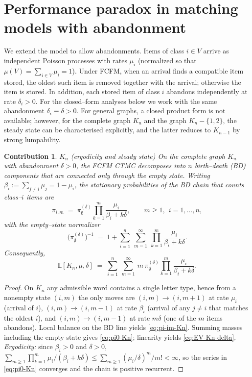 \documentclass[11pt]{article}
\newtheorem{contribution}{Contribution}
\begin{document}
\section{Performance paradox in matching models with abandonment}\label{sec:abandonment}
We extend the model to allow abandonments. Items of class $i\in V$ arrive as independent Poisson processes with rates $\mu_i$ (normalized so that $\mu(V)=\sum_{i\in V}\mu_i=1$). Under \textsc{FCFM}, when an arrival finds a compatible item stored, the oldest such item is removed together with the arrival; otherwise the item is stored. In addition, each stored item of class $i$ abandons independently at rate $\delta_i>0$. For the closed–form analyses below we work with the same abandonment $\delta_i\equiv\delta>0$.
For general graphs, a closed product form is not available; however, for the complete graph $K_n$ and the graph $K_n-\{1,2\}$, the steady state can be characterised explicitly, and the latter reduces to $K_{n-1}$ by strong lumpability.

\begin{contribution}{ $K_n$ (ergodicity and steady state)}
	On the complete graph $K_n$ with abandonment $\delta>0$, the \textsc{FCFM} CTMC decomposes into $n$ birth–death (BD) components that are connected only through the empty state. Writing $\beta_i:=\sum_{j\neq i}\mu_j=1-\mu_i$, the stationary probabilities of the BD chain that counts class–$i$ items are
	\begin{equation}\label{eq:pi-im-Kn}
		\pi_{i,m}\;=\;\pi_{\emptyset}^{(\delta)}\prod_{k=1}^{m}\frac{\mu_i}{\beta_i+k\delta},\qquad m\ge 1,\ \ i=1,\dots,n,
	\end{equation}
	with the empty–state normalizer
	\begin{equation}\label{eq:pi0-Kn}
		\bigl(\pi_{\emptyset}^{(\delta)}\bigr)^{-1}\;=\;1+\sum_{i=1}^{n}\ \sum_{m=1}^{\infty}\ \prod_{k=1}^{m}\frac{\mu_i}{\beta_i+k\delta}.
	\end{equation}
	Consequently,
	\begin{equation}\label{eq:EV-Kn-delta}
		\mathbb{E}[K_n,\mu,\delta]\;=\;\sum_{i=1}^{n}\ \sum_{m=1}^{\infty}\ m\,\pi_{\emptyset}^{(\delta)}\prod_{k=1}^{m}\frac{\mu_i}{\beta_i+k\delta}.
	\end{equation}
\end{contribution}

\begin{proof}[Proof]
	On $K_n$ any admissible word contains a single letter type, hence from a nonempty state $(i,m)$ the only moves are $(i,m)\to(i,m+1)$ at rate $\mu_i$ (arrival of $i$), $(i,m)\to(i,m-1)$ at rate $\beta_i$ (arrival of any $j\neq i$ that matches the oldest $i$), and $(i,m)\to(i,m-1)$ at rate $m\delta$ (one of the $m$ items abandons). Local balance on the BD line yields \eqref{eq:pi-im-Kn}. Summing masses including the empty state gives \eqref{eq:pi0-Kn}; linearity yields \eqref{eq:EV-Kn-delta}. 
	\emph{Ergodicity:} since $\beta_i>0$ and $\delta>0$, $\sum_{m\ge1}\prod_{k=1}^{m}\mu_i/(\beta_i+k\delta)\le \sum_{m\ge1}(\mu_i/\delta)^m/m!<\infty$, so the series in \eqref{eq:pi0-Kn} converges and the chain is positive recurrent.
\end{proof}
\end{document}
